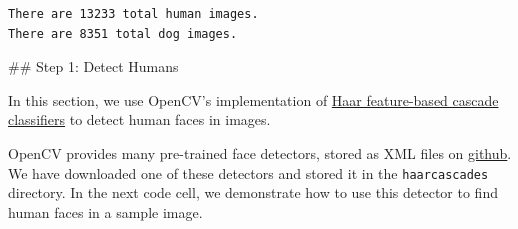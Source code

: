 \documentclass[11pt]{article}
\begin{document}
    \begin{Verbatim}[commandchars=\\\{\}]
There are 13233 total human images.
There are 8351 total dog images.

    \end{Verbatim}

     \#\# Step 1: Detect Humans

In this section, we use OpenCV's implementation of
\href{http://docs.opencv.org/trunk/d7/d8b/tutorial_py_face_detection.html}{Haar
feature-based cascade classifiers} to detect human faces in images.

OpenCV provides many pre-trained face detectors, stored as XML files on
\href{https://github.com/opencv/opencv/tree/master/data/haarcascades}{github}.
We have downloaded one of these detectors and stored it in the
\texttt{haarcascades} directory. In the next code cell, we demonstrate
how to use this detector to find human faces in a sample image.
\end{document}
